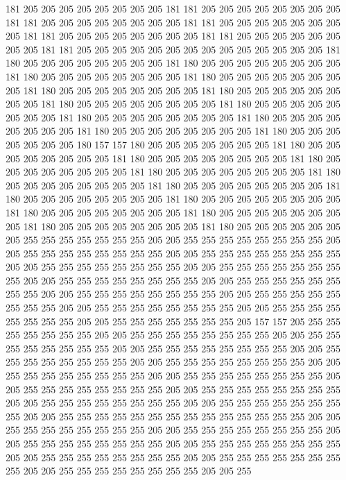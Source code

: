 181 205 205 205 205 205 205 205 205 181 181 205 205 205 205 205 205 205 205 181
181 205 205 205 205 205 205 205 205 181 181 205 205 205 205 205 205 205 205 181
181 205 205 205 205 205 205 205 205 181 181 205 205 205 205 205 205 205 205 181
181 205 205 205 205 205 205 205 205 205 205 205 205 205 205 181 180 205 205 205
205 205 205 205 205 181 180 205 205 205 205 205 205 205 205 181 180 205 205 205
205 205 205 205 205 181 180 205 205 205 205 205 205 205 205 181 180 205 205 205
205 205 205 205 205 181 180 205 205 205 205 205 205 205 205 181 180 205 205 205
205 205 205 205 205 181 180 205 205 205 205 205 205 205 205 181 180 205 205 205
205 205 205 205 205 181 180 205 205 205 205 205 205 205 205 181 180 205 205 205
205 205 205 205 205 181 180 205 205 205 205 205 205 205 180 157 157 180 205 205
205 205 205 205 205 181 180 205 205 205 205 205 205 205 205 181 180 205 205 205
205 205 205 205 205 181 180 205 205 205 205 205 205 205 205 181 180 205 205 205
205 205 205 205 205 181 180 205 205 205 205 205 205 205 205 181 180 205 205 205
205 205 205 205 205 181 180 205 205 205 205 205 205 205 205 181 180 205 205 205
205 205 205 205 205 181 180 205 205 205 205 205 205 205 205 181 180 205 205 205
205 205 205 205 205 181 180 205 205 205 205 205 205 205 205 181 180 205 205 205
205 205 205 205 255 255 255 255 255 255 255 205 205 255 255 255 255 255 255 255
255 205 205 255 255 255 255 255 255 255 255 205 205 255 255 255 255 255 255 255
255 205 205 255 255 255 255 255 255 255 255 205 205 255 255 255 255 255 255 255
255 205 205 255 255 255 255 255 255 255 255 205 205 255 255 255 255 255 255 255
255 205 205 255 255 255 255 255 255 255 255 205 205 255 255 255 255 255 255 255
255 205 205 255 255 255 255 255 255 255 255 205 205 255 255 255 255 255 255 255
255 205 205 255 255 255 255 255 255 255 205 157 157 205 255 255 255 255 255 255
255 205 205 255 255 255 255 255 255 255 255 205 205 255 255 255 255 255 255 255
255 205 205 255 255 255 255 255 255 255 255 205 205 255 255 255 255 255 255 255
255 205 205 255 255 255 255 255 255 255 255 205 205 255 255 255 255 255 255 255
255 205 205 255 255 255 255 255 255 255 255 205 205 255 255 255 255 255 255 255
255 205 205 255 255 255 255 255 255 255 255 205 205 255 255 255 255 255 255 255
255 205 205 255 255 255 255 255 255 255 255 205 205 255 255 255 255 255 255 255
255 255 255 255 255 255 255 205 205 255 255 255 255 255 255 255 255 205 205 255
255 255 255 255 255 255 255 205 205 255 255 255 255 255 255 255 255 205 205 255
255 255 255 255 255 255 255 205 205 255 255 255 255 255 255 255 255 205 205 255
255 255 255 255 255 255 255 205 205 255 255 255 255 255 255 255 255 205 205 255
